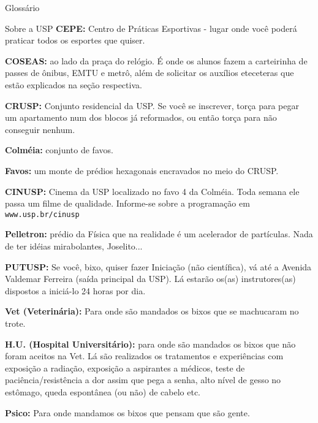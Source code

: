 \begin{secao}{Glossário}
\begin{subsecao}{Sobre a USP}
{\bf CEPE:} Centro de Práticas Esportivas - lugar onde você poderá praticar
todos os esportes que quiser.

{\bf COSEAS:} ao lado da praça do relógio. É onde os alunos fazem a carteirinha
de passes de ônibus, EMTU e metrô, além de solicitar os auxílios eteceteras que
estão explicados na seção respectiva.

{\bf CRUSP:} Conjunto residencial da USP. Se você se inscrever, torça para
pegar um apartamento num dos blocos já reformados, ou então torça para não
conseguir nenhum.

{\bf Colméia:} conjunto de favos.

{\bf Favos:} um monte de prédios hexagonais encravados no meio do CRUSP.

{\bf CINUSP:} Cinema da USP localizado no favo 4 da Colméia. Toda semana ele
passa um filme de qualidade. Informe-se sobre a programação em {\tt www.usp.br/cinusp}

{\bf Pelletron:} prédio da Física que na realidade é um acelerador de
partículas. Nada de ter idéias mirabolantes, Joselito...

{\bf PUTUSP:} Se você, bixo, quiser fazer Iniciação (não científica), vá até a
Avenida Valdemar Ferreira (saída principal da USP). Lá estarão os(as)
instrutores(as) dispostos a iniciá-lo 24 horas por dia.

{\bf Vet (Veterinária):} Para onde são mandados os bixos que se machucaram no
trote.

{\bf H.U. (Hospital Universitário):} para onde são mandados os bixos que não
foram aceitos na Vet. Lá são realizados os tratamentos e experiências com
exposição a radiação, exposição a aspirantes a médicos, teste de
paciência/resistência a dor assim que pega a senha, alto nível de gesso no
estômago, queda espontânea (ou não) de cabelo etc.

{\bf Psico:} Para onde mandamos os bixos que pensam que são gente.

\end{subsecao}
\end{secao}
